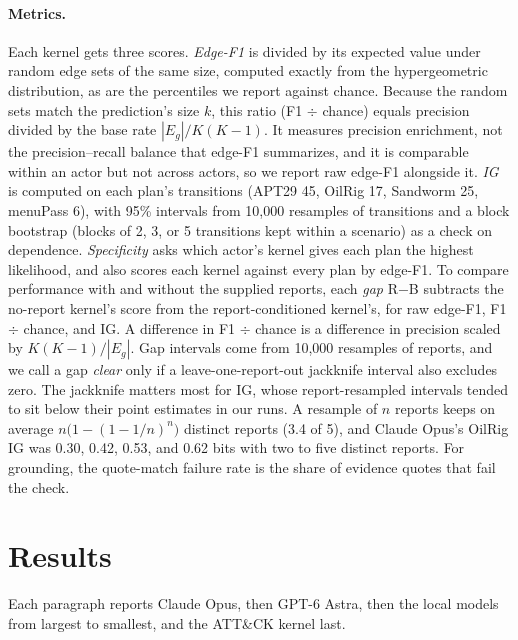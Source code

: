 \documentclass[letterpaper]{article} %
\begin{document}
\paragraph{Metrics.} Each kernel gets three scores. \emph{Edge-F1} is divided by its expected value under random edge sets of the same size, computed exactly from the hypergeometric distribution, as are the percentiles we report against chance. Because the random sets match the prediction's size $k$, this ratio (F1 $\div$ chance) equals precision divided by the base rate $|E_g|/K(K-1)$. It measures precision enrichment, not the precision--recall balance that edge-F1 summarizes, and it is comparable within an actor but not across actors, so we report raw edge-F1 alongside it. \emph{IG} is computed on each plan's transitions (APT29 45, OilRig 17, Sandworm 25, menuPass 6), with 95\% intervals from 10{,}000 resamples of transitions and a block bootstrap (blocks of 2, 3, or 5 transitions kept within a scenario) as a check on dependence. \emph{Specificity} asks which actor's kernel gives each plan the highest likelihood, and also scores each kernel against every plan by edge-F1. To compare performance with and without the supplied reports, each \emph{gap} R$-$B subtracts the no-report kernel's score from the report-conditioned kernel's, for raw edge-F1, F1 $\div$ chance, and IG. A difference in F1 $\div$ chance is a difference in precision scaled by $K(K-1)/|E_g|$. Gap intervals come from 10{,}000 resamples of reports, and we call a gap \emph{clear} only if a leave-one-report-out jackknife interval also excludes zero. The jackknife matters most for IG, whose report-resampled intervals tended to sit below their point estimates in our runs. A resample of $n$ reports keeps on average $n\bigl(1-(1-1/n)^n\bigr)$ distinct reports (3.4 of 5), and Claude Opus's OilRig IG was 0.30, 0.42, 0.53, and 0.62 bits with two to five distinct reports. For grounding, the quote-match failure rate is the share of evidence quotes that fail the check.
\section{Results}

Each paragraph reports Claude Opus, then GPT-6 Astra, then the local models from largest to smallest, and the ATT\&CK kernel last.
\end{document}
